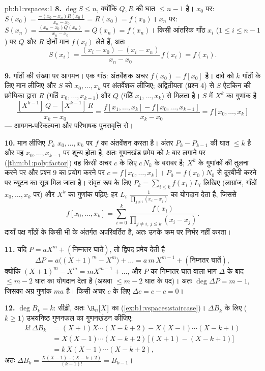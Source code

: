 \begin{solution}{pb:b1:vspaces:1}
\textbf{8.} $\deg S \leq n$, क्योंकि $Q, R$ की घात $\leq n - 1$ है। $x_0$
पर: $S(x_0) = \frac{-(x_0 - x_n) R(x_0)}{x_n - x_0} = R(x_0) = f(x_0)$।
$x_n$ पर: $S(x_n) = \frac{(x_n - x_0) Q(x_n)}{x_n - x_0} = Q(x_n) = f(x_n)$।
किसी आंतरिक गाँठ $x_i$ ($1 \leq i \leq n-1$) पर $Q$ और $R$ दोनों मान
$f(x_i)$ लेते हैं, अतः
\[
S(x_i) = \frac{(x_i - x_0) - (x_i - x_n)}{x_n - x_0}\, f(x_i)
= f(x_i) .
\]

\textbf{9.} गाँठों की संख्या पर आगमन। एक गाँठ: अंतर्वेशक अचर $f(x_0) =
f[x_0]$ है। दावे को $k$ गाँठों के लिए मान लीजिए और $S$ को $x_0, \dots, x_k$
पर अंतर्वेशक लीजिए; अद्वितीयता (प्रश्न 4) से $S$ ऐटकिन की प्रमेयिका द्वारा
$R$ (गाँठें $x_0, \dots, x_{k-1}$) और $Q$ (गाँठें $x_1, \dots, x_k$) से
मिलता है। $S$ में $X^{k}$ का गुणांक है
\[
\frac{[X^{k-1}]\,Q - [X^{k-1}]\,R}{x_k - x_0}
= \frac{f[x_1, \dots, x_k] - f[x_0, \dots, x_{k-1}]}{x_k - x_0}
= f[x_0, \dots, x_k]
\]
--- आगमन-परिकल्पना और परिभाषक पुनरावृत्ति से।

\textbf{10.} मान लीजिए $P_k$ $x_0, \dots, x_k$ पर $f$ का अंतर्वेशन करता है।
अंतर $P_k - P_{k-1}$ की घात $\leq k$ है और वह $x_0, \dots, x_{k-1}$ पर शून्य
होता है, अतः गुणनखंड प्रमेय को $k$ बार लगाने पर (\cref{thm:b1:poly:factor})
वह किसी अचर $c$ के लिए $c\,N_k$ के बराबर है; $X^{k}$ के गुणांकों की तुलना
करने पर और प्रश्न 9 का प्रयोग करने पर $c = f[x_0, \dots, x_k]$। $P_0 =
f(x_0) N_0$ से दूरबीनी करने पर न्यूटन का सूत्र मिल जाता है। संवृत रूप के लिए
$P_k = \sum_{i \leq k} f(x_i) L_i$ लिखिए (लाग्रांज, गाँठों $x_0, \dots, x_k$
पर) और $X^{k}$ का गुणांक पढ़िए: हर $L_i$ $\frac{1}{\prod_{j \neq i}(x_i -
x_j)}$ का योगदान देता है, जिससे
\[
f[x_0, \dots, x_k] = \sum_{i=0}^{k}
\frac{f(x_i)}{\prod_{j \neq i,\, j \leq k}(x_i - x_j)} .
\]
दायाँ पक्ष गाँठों के किसी भी  के अंतर्गत अपरिवर्तित है, अतः  उनके क्रम पर निर्भर नहीं करता।

\textbf{11.} यदि $P = a X^m + (\text{निम्नतर घातें})$, तो द्विपद प्रमेय देती
है
\[
\Delta P = a\bigl((X+1)^m - X^m\bigr) + \dots
= a\,m\,X^{m-1} + (\text{निम्नतर घातें}),
\]
क्योंकि $(X+1)^m - X^m = m X^{m-1} + \dots$, और $P$ का निम्नतर-घात वाला भाग
$\Delta$ के बाद $\leq m - 2$ घात का योगदान देता है (अथवा $\leq m-2$ घात के
पद)। अतः $\deg \Delta P = m - 1$, जिसका अग्र गुणांक $m a$ है। किसी अचर $c$
के लिए $\Delta c = c - c = 0$।

\textbf{12.} $\deg B_k = k$: सीढ़ी, अतः $\R_n[X]$ का 
(\cref{ex:b1:vspaces:staircase})। $\Delta B_k$ के लिए ($k \geq 1$) उभयनिष्ठ
गुणनफल का गुणनखंडन कीजिए:
\begin{align*}
k!\,\Delta B_k
&= (X+1)X\cdots(X-k+2) - X(X-1)\cdots(X-k+1) \\
&= X(X-1)\cdots(X-k+2)\,\bigl[(X+1) - (X-k+1)\bigr] \\
&= k\,X(X-1)\cdots(X-k+2),
\end{align*}
अतः $\Delta B_k = \frac{X(X-1)\cdots(X-k+2)}{(k-1)!} = B_{k-1}$।


\end{solution}

